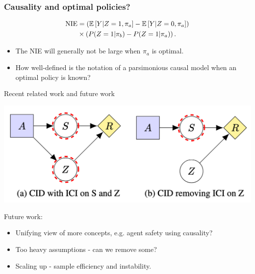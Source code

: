 
\begin{frame}\frametitle{Causality and optimal policies?}
    \begin{align*}
    	\mathrm{NIE} & = \left( \E\left[Y | Z=1, \pi_a \right] - \E\left[Y | Z=0, \pi_a \right] \right)  \\  
    	& \times  \left( P(Z=1| \pi_b) - P(Z=1| \pi_a) \right).%
    \end{align*}
    \begin{itemize}
    \item The NIE will generally not be large when $\pi_a$ is optimal.
    \item How well-defined is the notation of a parsimonious causal model when an optimal policy is known? 
    \end{itemize}
\end{frame}

\begin{frame}{Recent related work and future work}
    \begin{center}
        \includegraphics[width=.5\textwidth]{images/cid.png}
    \end{center}
    
    Future work:
    \begin{itemize}
    \item Unifying view of more concepts, e.g. agent safety using causality?
    \item Too heavy assumptions - can we remove some?
    \item Scaling up - sample efficiency and instability.
    \end{itemize}

\end{frame}

